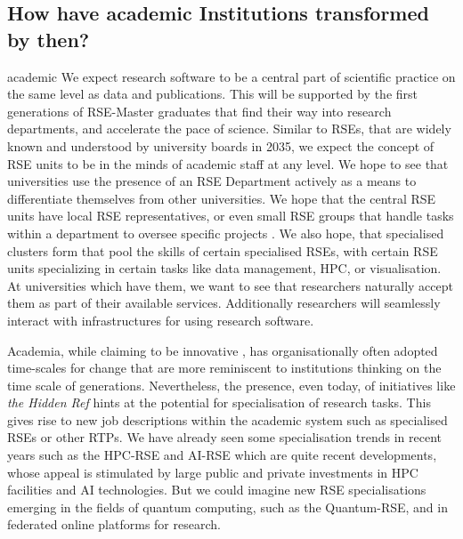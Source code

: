 \documentclass{eceasst}
\begin{document}
\subsection{How have academic Institutions transformed by then?}
\begin{whatis}{}{academic}
We expect research software to be a central part of scientific practice on the same level as data and publications.
This will be supported by the first generations of RSE-Master graduates that find their way into research departments, and accelerate the pace of science.
Similar to RSEs, that are widely known and understood by university boards in 2035, we expect the concept of RSE units to be in the minds
of academic staff at any level.
We hope to see that universities use the presence of an RSE Department actively as a means to differentiate themselves from other universities.
We hope that the central RSE units have local RSE representatives, or even small RSE groups that handle tasks within a department to oversee specific projects \cite{Kempf2025-draft}.
We also hope, that specialised clusters form that pool the skills of certain specialised RSEs, with certain RSE units specializing in certain tasks like data management, HPC, or visualisation.
At universities which have them, we want to see that researchers naturally accept them as part of their available services.
Additionally researchers will seamlessly interact with infrastructures for using research software.
\end{whatis}
Academia, while claiming to be innovative \cite{wzvgbayern}, has organisationally often adopted time-scales for change that are more reminiscent to institutions thinking on the time scale of generations.
Nevertheless, the presence, even today, of initiatives like \emph{the Hidden Ref} \cite{hiddenref} hints at the potential for specialisation of research tasks. This gives rise to new job descriptions within the academic system such as specialised RSEs or other RTPs.
We have already seen some specialisation trends in recent years such as
the HPC-RSE and AI-RSE which are quite recent developments, whose appeal is stimulated by large public and private investments in HPC facilities and AI technologies.
But we could imagine new RSE specialisations emerging in the fields
of quantum computing, such as the Quantum-RSE, and in federated online platforms for research.
\end{document}

